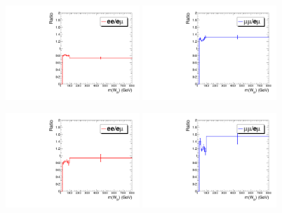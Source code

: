 \begin{figure}[htbp]
  \centering

  \includegraphics[width=0.45\textwidth]{figures/2016/Ratios_Boosted_elFatJet_WRCand_Mass_TTLX_powheg.pdf}
  \hspace{0.01\textwidth}
  \includegraphics[width=0.45\textwidth]{figures/2016/Ratios_Boosted_muFatJet_WRCand_Mass_TTLX_powheg.pdf}
  \vspace{0.01\textwidth}

  \includegraphics[width=0.45\textwidth]{figures/2017/Ratios_Boosted_elFatJet_WRCand_Mass_TTLX_powheg.pdf}
  \hspace{0.01\textwidth}
  \includegraphics[width=0.45\textwidth]{figures/2017/Ratios_Boosted_muFatJet_WRCand_Mass_TTLX_powheg.pdf}
  

\end{figure}

